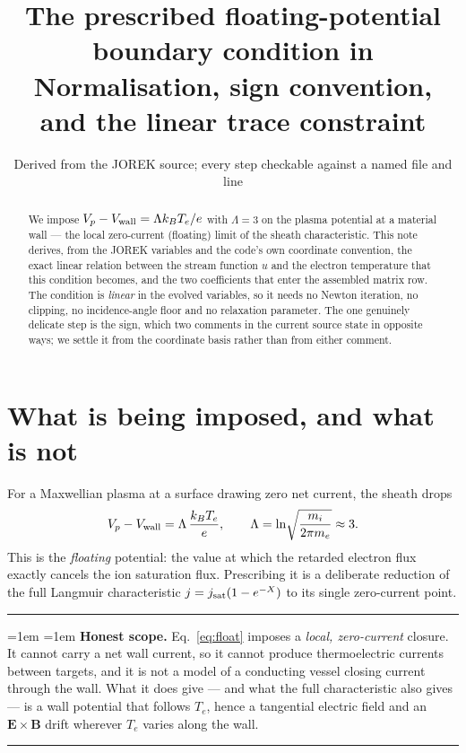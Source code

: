 \documentclass[11pt,a4paper]{article}
\title{The prescribed floating-potential boundary condition in \code{model600}\\
\large Normalisation, sign convention, and the linear trace constraint}
\author{Derived from the JOREK source; every step checkable against a named file and line}
\date{}
\newenvironment{keybox}{\par\medskip\noindent\rule{\linewidth}{0.4pt}\par\smallskip%
\leftskip=1em \rightskip=1em\relax}{\par\smallskip\leftskip=0pt \rightskip=0pt\noindent\rule{\linewidth}{0.4pt}\par\medskip}
\begin{document}
\maketitle

\begin{abstract}
\noindent
We impose $V_p-V_{\rm wall}=\Lambda k_BT_e/e$ with $\Lambda=3$ on the plasma potential at a
material wall --- the local zero-current (floating) limit of the sheath characteristic. This note
derives, from the JOREK variables and the code's own coordinate convention, the exact linear
relation between the stream function $u$ and the electron temperature that this condition becomes,
and the two coefficients that enter the assembled matrix row. The condition is \emph{linear} in the
evolved variables, so it needs no Newton iteration, no clipping, no incidence-angle floor and no
relaxation parameter. The one genuinely delicate step is the sign, which two comments in the
current source state in opposite ways; we settle it from the coordinate basis rather than from
either comment.
\end{abstract}

\section{What is being imposed, and what is not}

For a Maxwellian plasma at a surface drawing zero net current, the sheath drops
\begin{equation}
  V_p-V_{\rm wall}=\Lambda\,\frac{k_BT_e}{e},\qquad
  \Lambda=\ln\!\sqrt{\frac{m_i}{2\pi m_e}}\approx 3 .
  \label{eq:float}
\end{equation}
This is the \emph{floating} potential: the value at which the retarded electron flux exactly
cancels the ion saturation flux. Prescribing it is a deliberate reduction of the full
Langmuir characteristic $j=j_{\rm sat}(1-e^{-X})$ to its single zero-current point.

\begin{keybox}
\textbf{Honest scope.} Eq.~\eqref{eq:float} imposes a \emph{local, zero-current} closure. It
cannot carry a net wall current, so it cannot produce thermoelectric currents between targets, and
it is not a model of a conducting vessel closing current through the wall. What it does give ---
and what the full characteristic also gives --- is a wall potential that follows $T_e$, hence a
tangential electric field and an $\bm{E}\times\bm{B}$ drift wherever $T_e$ varies along the wall.
\end{keybox}
\end{document}
